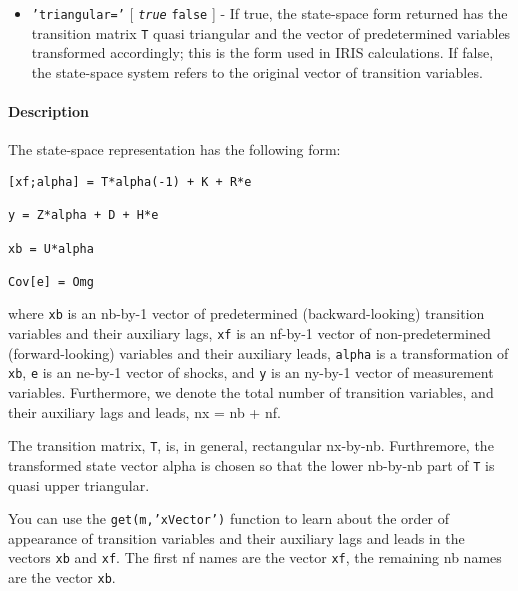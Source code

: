 \begin{itemize}
\itemsep1pt\parskip0pt
\item
  \texttt{'triangular='} {[} \emph{\texttt{true}} \textbar{}
  \texttt{false} {]} - If true, the state-space form returned has the
  transition matrix \texttt{T} quasi triangular and the vector of
  predetermined variables transformed accordingly; this is the form used
  in IRIS calculations. If false, the state-space system refers to the
  original vector of transition variables.
\end{itemize}

\paragraph{Description}

The state-space representation has the following form:

\begin{verbatim}
[xf;alpha] = T*alpha(-1) + K + R*e

y = Z*alpha + D + H*e

xb = U*alpha

Cov[e] = Omg
\end{verbatim}

where \texttt{xb} is an nb-by-1 vector of predetermined
(backward-looking) transition variables and their auxiliary lags,
\texttt{xf} is an nf-by-1 vector of non-predetermined (forward-looking)
variables and their auxiliary leads, \texttt{alpha} is a transformation
of \texttt{xb}, \texttt{e} is an ne-by-1 vector of shocks, and
\texttt{y} is an ny-by-1 vector of measurement variables. Furthermore,
we denote the total number of transition variables, and their auxiliary
lags and leads, nx = nb + nf.

The transition matrix, \texttt{T}, is, in general, rectangular nx-by-nb.
Furthremore, the transformed state vector alpha is chosen so that the
lower nb-by-nb part of \texttt{T} is quasi upper triangular.

You can use the \texttt{get(m,'xVector')} function to learn about the
order of appearance of transition variables and their auxiliary lags and
leads in the vectors \texttt{xb} and \texttt{xf}. The first nf names are
the vector \texttt{xf}, the remaining nb names are the vector
\texttt{xb}.


